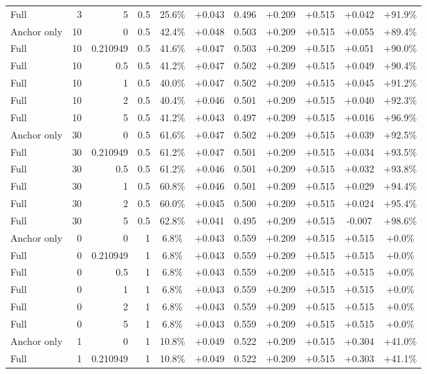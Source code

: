 \begin{table}[htbp]
\begin{tabular}{lrrrccccccc}
Full & 3 & 5 & 0.5 & 25.6\% & +0.043 & 0.496 & +0.209 & +0.515 & +0.042 & +91.9\% \\
Anchor only & 10 & 0 & 0.5 & 42.4\% & +0.048 & 0.503 & +0.209 & +0.515 & +0.055 & +89.4\% \\
Full & 10 & 0.210949 & 0.5 & 41.6\% & +0.047 & 0.503 & +0.209 & +0.515 & +0.051 & +90.0\% \\
Full & 10 & 0.5 & 0.5 & 41.2\% & +0.047 & 0.502 & +0.209 & +0.515 & +0.049 & +90.4\% \\
Full & 10 & 1 & 0.5 & 40.0\% & +0.047 & 0.502 & +0.209 & +0.515 & +0.045 & +91.2\% \\
Full & 10 & 2 & 0.5 & 40.4\% & +0.046 & 0.501 & +0.209 & +0.515 & +0.040 & +92.3\% \\
Full & 10 & 5 & 0.5 & 41.2\% & +0.043 & 0.497 & +0.209 & +0.515 & +0.016 & +96.9\% \\
Anchor only & 30 & 0 & 0.5 & 61.6\% & +0.047 & 0.502 & +0.209 & +0.515 & +0.039 & +92.5\% \\
Full & 30 & 0.210949 & 0.5 & 61.2\% & +0.047 & 0.501 & +0.209 & +0.515 & +0.034 & +93.5\% \\
Full & 30 & 0.5 & 0.5 & 61.2\% & +0.046 & 0.501 & +0.209 & +0.515 & +0.032 & +93.8\% \\
Full & 30 & 1 & 0.5 & 60.8\% & +0.046 & 0.501 & +0.209 & +0.515 & +0.029 & +94.4\% \\
Full & 30 & 2 & 0.5 & 60.0\% & +0.045 & 0.500 & +0.209 & +0.515 & +0.024 & +95.4\% \\
Full & 30 & 5 & 0.5 & 62.8\% & +0.041 & 0.495 & +0.209 & +0.515 & -0.007 & +98.6\% \\
Anchor only & 0 & 0 & 1 & 6.8\% & +0.043 & 0.559 & +0.209 & +0.515 & +0.515 & +0.0\% \\
Full & 0 & 0.210949 & 1 & 6.8\% & +0.043 & 0.559 & +0.209 & +0.515 & +0.515 & +0.0\% \\
Full & 0 & 0.5 & 1 & 6.8\% & +0.043 & 0.559 & +0.209 & +0.515 & +0.515 & +0.0\% \\
Full & 0 & 1 & 1 & 6.8\% & +0.043 & 0.559 & +0.209 & +0.515 & +0.515 & +0.0\% \\
Full & 0 & 2 & 1 & 6.8\% & +0.043 & 0.559 & +0.209 & +0.515 & +0.515 & +0.0\% \\
Full & 0 & 5 & 1 & 6.8\% & +0.043 & 0.559 & +0.209 & +0.515 & +0.515 & +0.0\% \\
Anchor only & 1 & 0 & 1 & 10.8\% & +0.049 & 0.522 & +0.209 & +0.515 & +0.304 & +41.0\% \\
Full & 1 & 0.210949 & 1 & 10.8\% & +0.049 & 0.522 & +0.209 & +0.515 & +0.303 & +41.1\% \\

\end{tabular}
\end{table}
